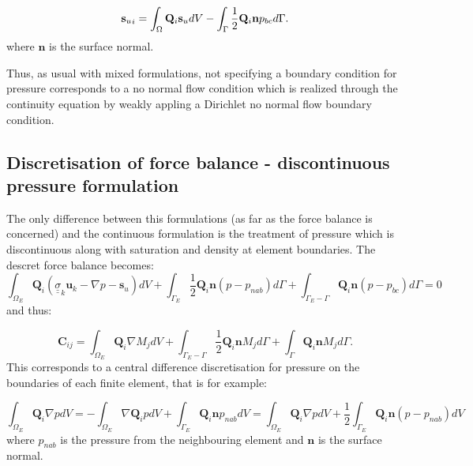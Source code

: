 \begin{equation}
{{\bf s}_u}_i= \int_\Omega {\mathbf Q}_i {\mathbf s}_u dV
- \int_\Gamma \frac{1}{2}{\mathbf Q}_i {\mathbf n} p_{bc} d\Gamma.
\end{equation}
where ${\mathbf n}$ is the surface normal.

Thus, as usual with mixed formulations, not specifying a
boundary condition for pressure corresponds to a no
normal flow condition which is realized through the continuity
equation by weakly appling a Dirichlet no normal
flow boundary condition.



\subsection{Discretisation of force balance - discontinuous pressure formulation}

The only difference between this formulations (as far as the force balance
is concerned) and the continuous formulation is the treatment of pressure
which is discontinuous along with saturation and density at element
boundaries. The descret force balance becomes:
\begin{equation}
\int_{\Omega_E} {\mathbf Q}_i ( {\underline {\underline \sigma}}_k
{\mathbf u}_k - \nabla p -{\mathbf s}_u) dV
+  \int_{\Gamma_{E}} \frac{1}{2}{\mathbf Q}_i {\mathbf n} (p - p_{nab}) d\Gamma
+  \int_{\Gamma_{E}-\Gamma} {\mathbf Q}_i {\mathbf n} (p - p_{bc}) d\Gamma =0
\end{equation}
and thus:

\begin{equation}
{\mathbf C}_{ij}=\int_{\Omega_E} {\mathbf Q}_i \nabla M_j dV
+ \int_{\Gamma_{E}-\Gamma} \frac{1}{2}{\mathbf Q}_i {\mathbf n} M_j d\Gamma
+ \int_\Gamma {\mathbf Q}_i {\mathbf n} M_j d\Gamma .
\end{equation}
This corresponds to a central difference discretisation for pressure
on the boundaries of each finite element, that is for example:

\begin{equation}
\int_{\Omega_E} {\mathbf Q}_i \nabla p dV = -\int_{\Omega_E} \nabla {\mathbf Q}_i  p dV
+ \int_{\Gamma_E} {\mathbf Q}_i {\mathbf n} p_{nab} dV
= \int_{\Omega_E} {\mathbf Q}_i \nabla p dV
+ \frac{1}{2} \int_{\Gamma_E} {\mathbf Q}_i {\mathbf n} (p-p_{nab}) dV
\label{dg-sat-form}
\end{equation}
where $p_{nab}$ is the pressure from the neighbouring
element and ${\mathbf n}$ is the surface normal.


